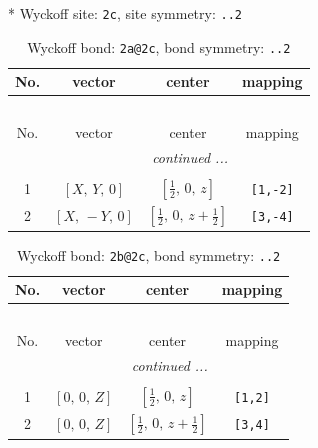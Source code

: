 \documentclass[fleqn,8pt]{jsarticle}
\begin{document}
* Wyckoff site: {\tt 2c}, site symmetry: {\tt ..2}
\renewcommand{\arraystretch}{1.2}
\begin{longtable}{cccc}
\caption{Wyckoff bond: {\tt 2a@2c}, bond symmetry: {\tt ..2}}
 \\
 \hline \hline
No. & vector & center & mapping \\ \hline \endfirsthead

\multicolumn{3}{l}{\tablename\ \thetable{}} \\
 \hline \hline
No. & vector & center & mapping \\ \hline \endhead

 \hline \hline
\multicolumn{3}{r}{\footnotesize\it continued ...} \\ \endfoot

 \hline \hline
\multicolumn{3}{r}{} \\ \endlastfoot

1 & $\left[ X,\, Y,\, 0 \right]$ & $\left[ \frac{1}{2},\, 0,\, z \right]$ & {\tt [1,-2]} \\ \hline
2 & $\left[ X,\, - Y,\, 0 \right]$ & $\left[ \frac{1}{2},\, 0,\, z + \frac{1}{2} \right]$ & {\tt [3,-4]} \\
\end{longtable}
\renewcommand{\arraystretch}{1.2}
\begin{longtable}{cccc}
\caption{Wyckoff bond: {\tt 2b@2c}, bond symmetry: {\tt ..2}}
 \\
 \hline \hline
No. & vector & center & mapping \\ \hline \endfirsthead

\multicolumn{3}{l}{\tablename\ \thetable{}} \\
 \hline \hline
No. & vector & center & mapping \\ \hline \endhead

 \hline \hline
\multicolumn{3}{r}{\footnotesize\it continued ...} \\ \endfoot

 \hline \hline
\multicolumn{3}{r}{} \\ \endlastfoot

1 & $\left[ 0,\, 0,\, Z \right]$ & $\left[ \frac{1}{2},\, 0,\, z \right]$ & {\tt [1,2]} \\ \hline
2 & $\left[ 0,\, 0,\, Z \right]$ & $\left[ \frac{1}{2},\, 0,\, z + \frac{1}{2} \right]$ & {\tt [3,4]} \\
\end{longtable}
\renewcommand{\arraystretch}{1.2}
\end{document}
